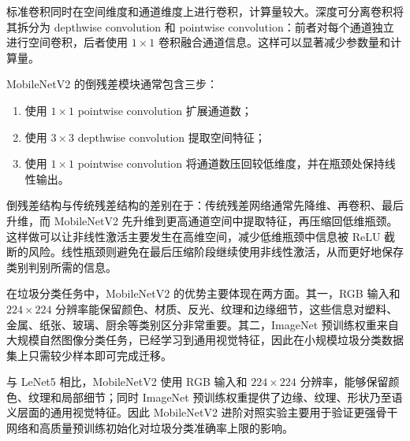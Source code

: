标准卷积同时在空间维度和通道维度上进行卷积，计算量较大。深度可分离卷积将其拆分为 depthwise convolution 和 pointwise convolution：前者对每个通道独立进行空间卷积，后者使用 $1\times1$ 卷积融合通道信息。这样可以显著减少参数量和计算量。

MobileNetV2 的倒残差模块通常包含三步：

\begin{enumerate}[label=(\arabic*)]
  \item 使用 $1\times1$ pointwise convolution 扩展通道数；
  \item 使用 $3\times3$ depthwise convolution 提取空间特征；
  \item 使用 $1\times1$ pointwise convolution 将通道数压回较低维度，并在瓶颈处保持线性输出。
\end{enumerate}

倒残差结构与传统残差结构的差别在于：传统残差网络通常先降维、再卷积、最后升维，而 MobileNetV2 先升维到更高通道空间中提取特征，再压缩回低维瓶颈。这样做可以让非线性激活主要发生在高维空间，减少低维瓶颈中信息被 ReLU 截断的风险。线性瓶颈则避免在最后压缩阶段继续使用非线性激活，从而更好地保存类别判别所需的信息。

在垃圾分类任务中，MobileNetV2 的优势主要体现在两方面。其一，RGB 输入和 $224\times224$ 分辨率能保留颜色、材质、反光、纹理和边缘细节，这些信息对塑料、金属、纸张、玻璃、厨余等类别区分非常重要。其二，ImageNet 预训练权重来自大规模自然图像分类任务，已经学习到通用视觉特征，因此在小规模垃圾分类数据集上只需较少样本即可完成迁移。

与 LeNet5 相比，MobileNetV2 使用 RGB 输入和 $224\times224$ 分辨率，能够保留颜色、纹理和局部细节；同时 ImageNet 预训练权重提供了边缘、纹理、形状乃至语义层面的通用视觉特征。因此 MobileNetV2 进阶对照实验主要用于验证更强骨干网络和高质量预训练初始化对垃圾分类准确率上限的影响。
